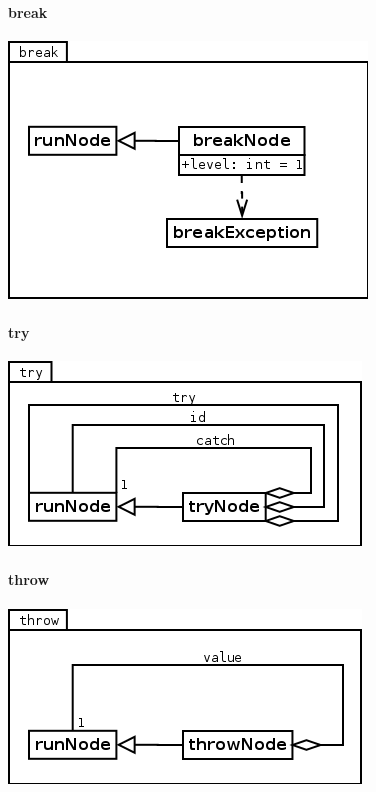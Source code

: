\paragraph{break}
\begin{center}
\includegraphics[scale=0.4]{break.png} \\
\end{center}

\paragraph{try}
\begin{center}
\includegraphics[scale=0.4]{try.png} \\
\end{center}

\paragraph{throw}
\begin{center}
\includegraphics[scale=0.4]{throw.png} \\
\end{center}



